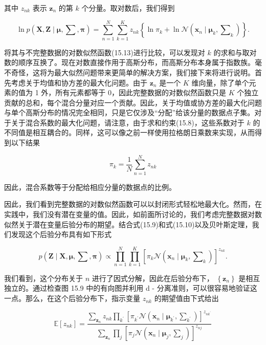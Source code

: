 \documentclass[10pt]{article}
\begin{document}
其中 \({z}_{nk}\) 表示 \({\mathbf{z}}_{n}\) 的第 \(k\) 个分量。取对数后，我们得到

\[
\ln p\left( {\mathbf{X},\mathbf{Z} \mid  \mathbf{\mu },\mathbf{\sum },\mathbf{\pi }}\right)  = \mathop{\sum }\limits_{{n = 1}}^{N}\mathop{\sum }\limits_{{k = 1}}^{K}{z}_{nk}\left\{  {\ln {\pi }_{k} + \ln \mathcal{N}\left( {{\mathbf{x}}_{n} \mid  {\mathbf{\mu }}_{k},{\mathbf{\sum }}_{k}}\right) }\right\}  . \tag{15.26}
\]

将其与不完整数据的对数似然函数(15.13)进行比较，可以发现对 \(k\) 的求和与取对数的顺序互换了。现在对数直接作用于高斯分布，而高斯分布本身属于指数族。毫不奇怪，这将为最大似然问题带来更简单的解决方案，我们接下来将进行说明。首先考虑关于均值和协方差的最大化问题。由于 \({\mathbf{z}}_{n}\) 是一个 \(K\) 维向量，除了单个元素的值为 1 外，所有元素都等于 0，因此完整数据的对数似然函数只是 \(K\) 个独立贡献的总和，每个混合分量对应一个贡献。因此，关于均值或协方差的最大化问题与单个高斯分布的情况完全相同，只是它仅涉及“分配”给该分量的数据点子集。对于关于混合系数的最大化问题，请注意，由于求和约束(15.8)，这些系数对于 \(k\) 的不同值是相互耦合的。同样，这可以像之前一样使用拉格朗日乘数来实现，从而得到以下结果

\[
{\pi }_{k} = \frac{1}{N}\mathop{\sum }\limits_{{n = 1}}^{N}{z}_{nk} \tag{15.27}
\]

因此，混合系数等于分配给相应分量的数据点的比例。

因此，我们看到完整数据的对数似然函数可以以封闭形式轻松地最大化。然而，在实践中，我们没有潜在变量的值。因此，如前面所讨论的，我们考虑完整数据对数似然关于潜在变量后验分布的期望。结合式(15.9)和式(15.10)以及贝叶斯定理，我们发现这个后验分布具有如下形式

\[
p\left( {\mathbf{Z} \mid  \mathbf{X},\mathbf{\mu },\mathbf{\sum },\mathbf{\pi }}\right)  \propto  \mathop{\prod }\limits_{{n = 1}}^{N}\mathop{\prod }\limits_{{k = 1}}^{K}{\left\lbrack  {\pi }_{k}\mathcal{N}\left( {\mathbf{x}}_{n} \mid  {\mathbf{\mu }}_{k},{\mathbf{\sum }}_{k}\right) \right\rbrack  }^{{z}_{nk}}. \tag{15.28}
\]

我们看到，这个分布关于 \(n\) 进行了因式分解，因此在后验分布下， \(\left\{  {\mathbf{z}}_{n}\right\}\) 是相互独立的。通过检查图 15.9 中的有向图并利用 d - 分离准则，可以很容易地验证这一点。那么，在这个后验分布下，指示变量 \({z}_{nk}\) 的期望值由下式给出

\[
\mathbb{E}\left\lbrack  {z}_{nk}\right\rbrack   = \frac{\mathop{\sum }\limits_{{\mathbf{z}}_{n}}{z}_{nk}\mathop{\prod }\limits_{{k}^{\prime }}{\left\lbrack  {\pi }_{{k}^{\prime }}\mathcal{N}\left( {\mathbf{x}}_{n} \mid  {\mathbf{\mu }}_{{k}^{\prime }},{\mathbf{\sum }}_{{k}^{\prime }}\right) \right\rbrack  }^{{z}_{n{k}^{\prime }}}}{\mathop{\sum }\limits_{{\mathbf{z}}_{n}}\mathop{\prod }\limits_{j}{\left\lbrack  {\pi }_{j}\mathcal{N}\left( {\mathbf{x}}_{n} \mid  {\mathbf{\mu }}_{j},{\mathbf{\sum }}_{j}\right) \right\rbrack  }^{{z}_{nj}}}
\]
\end{document}
